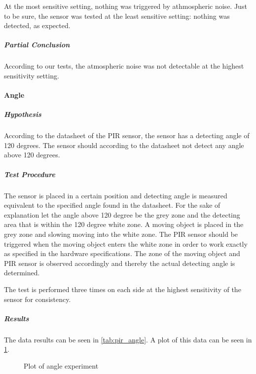 At the most sensitive setting, nothing was triggered by athmospheric noise. Just
to be sure, the sensor was tested at the least sensitive setting: nothing was
detected, as expected.

\subparagraph{Partial Conclusion}
\label{subp:SenPartial Conclusion}

According to our tests, the atmospheric noise was not detectable at the highest
sensitivity setting.

\paragraph{Angle}
\label{par:Angle}

\subparagraph{Hypothesis}
\label{subp:AngHypothesis}
According to the datasheet of the PIR sensor,
the sensor has a detecting angle of 120 degrees.
The sensor should according to the datasheet not detect any angle above 120 degrees.

\subparagraph{Test Procedure}
\label{subp:AngTest Procedure}
The sensor is placed in a certain position and detecting angle is measured equivalent to
the specified angle found in the datasheet.
For the sake of explanation let the angle above 120 degree be the grey zone and
the detecting area that is within the 120 degree white zone.
A moving object is placed in the grey zone and slowing moving into the white zone.
The PIR sensor should be triggered when the moving object enters the white zone in order
to work exactly as specified in the hardware specifications.
The zone of the moving object and PIR sensor is observed accordingly
and thereby the actual detecting angle is determined.

The test is performed three times on each side at the highest sensitivity of the sensor for consistency.

\subparagraph{Results}
\label{subp:AngResults}

The data results can be seen in \cref{tab:pir_angle}. A plot of this data can be
seen in \cref{fig:pir_angle}.

\begin{figure}
\centering
{}
\caption{Plot of angle experiment}\label{fig:pir_angle}
\end{figure}

